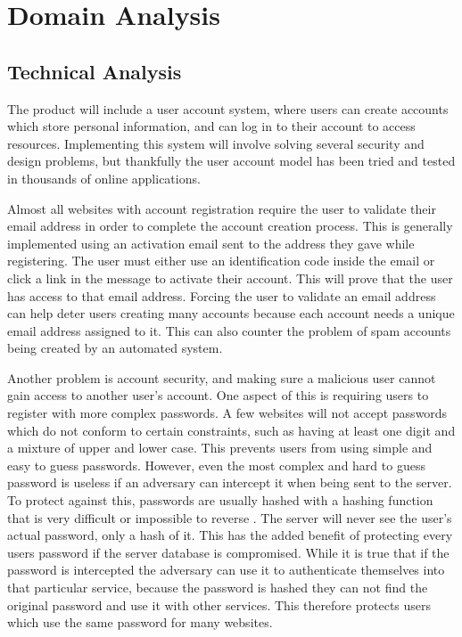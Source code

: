 \section{Domain Analysis}
	\subsection{Technical Analysis}
		The product will include a user account system, where users can create 
		accounts which store personal information, and can log in to their 
		account to access resources. Implementing this system will involve 
		solving several security and design problems, but thankfully the user 
		account model has been tried and tested in thousands of online 
		applications.

		Almost all websites with account registration require the user to 
		validate their email address in order to complete the account creation 
		process. This is generally implemented using an activation email sent 
		to the address they gave while registering. The user must either use 
		an identification code inside the email or click a link in the message 
		to activate their account. This will prove that the user has access to 
		that email address. Forcing the user to validate an email address can 
		help deter users creating many accounts because each account needs a 
		unique email address assigned to it. This can also counter the problem 
		of spam accounts being created by an automated system.

		Another problem is account security, and making sure a malicious user 
		cannot gain access to another user's account. One aspect of this is 
		requiring users to register with more complex passwords. A few 
		websites will not accept passwords which do not conform to certain 
		constraints, such as having at least one digit and a mixture of upper 
		and lower case. This prevents users from using simple and easy to 
		guess passwords. However, even the most complex and hard to guess 
		password is useless if an adversary can intercept it when being sent 
		to the server. To protect against this, passwords are usually hashed 
		with a hashing function that is very difficult or impossible to reverse
		. The server will never see the user's actual password, only a hash of 
		it. This has the added benefit of protecting every users password if 
		the server database is compromised. While it is true that if the 
		password is intercepted the adversary can use it to authenticate 
		themselves into that particular service, because the password is 
		hashed they can not find the original password and use it with other 
		services. This therefore protects users which use the same password 
		for many websites.

